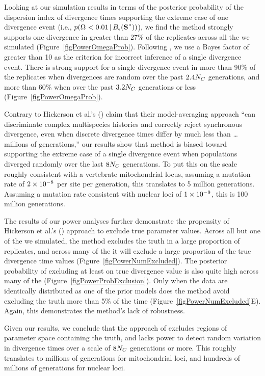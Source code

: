 Looking at our simulation results in terms of the posterior probability of the
dispersion index of divergence times supporting the extreme case of one
divergence event (i.e., $p(\vmratio{} < 0.01 \given \ssSpace)$), we find the
method strongly supports one divergence in greater than 27\% of the replicates
across all the  we simulated (Figure~\ref{figPowerOmegaProb}).
Following \citet{Hickerson2013}, we use a Bayes factor of greater than 10 as
the criterion for incorrect inference of a single divergence event.
There is strong support for a single divergence event in more than 90\% of the
replicates when divergences are random over the past $2.4N_C$
generations, and more than 60\% when over the past $3.2N_C$
generations or less (Figure~\ref{figPowerOmegaProb}).

Contrary to Hickerson et al.'s (\citeyear{Hickerson2013}) claim that their
model-averaging approach ``can discriminate complex multispecies histories and
correctly reject synchronous divergence, even when discrete divergence times
differ by much less than \ldots millions of generations,'' our results show
that method is biased toward supporting the extreme case of a single
divergence event when populations diverged randomly over the last
$8N_C$ generations.
To put this on the scale roughly consistent with a vertebrate mitochondrial
locus, assuming a mutation rate of $2\times 10^{-8}$ per site per generation, this
translates to 5 million generations.
Assuming a mutation rate consistent with nuclear loci of $1\times 10^{-9}$, this is 100
million generations.

The results of our power analyses further demonstrate the propensity of
Hickerson et al.'s (\citeyear{Hickerson2013}) approach to exclude true
parameter values.
Across all but one of the  we simulated, the method excludes the
truth in a large proportion of replicates, and across many of the  it
will exclude a large proportion of the true divergence time values
(Figure~\ref{figPowerNumExcluded}).
The posterior probability of excluding at least on true divergence value is
also quite high across many of the 
(Figure~\ref{figPowerProbExclusion}).
Only when the data are identically distributed as one of the prior models does
the method avoid excluding the truth more than 5\% of the time
(Figure~\ref{figPowerNumExcluded}E).
Again, this demonstrates the method's lack of robustness.

Given our results, we conclude that the approach of \citet{Hickerson2013}
excludes regions of parameter space containing the truth, and lacks power to
detect random variation in divergence times over a scale of $8N_C$
generations or more.
This roughly translates to millions of generations for mitochondrial loci, and
hundreds of millions of generations for nuclear loci.


